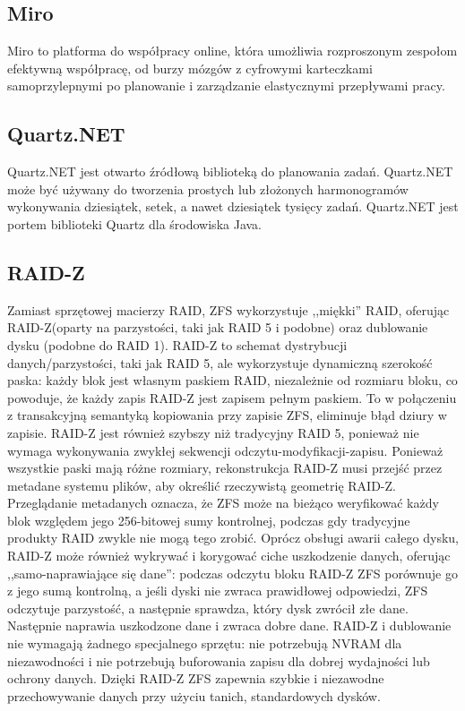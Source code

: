 \documentclass[12pt,a4paper]{article}
\begin{document}
		\subsection{Miro}
			\indent Miro to platforma do współpracy online, która umożliwia rozproszonym zespołom efektywną współpracę, od burzy mózgów z cyfrowymi karteczkami samoprzylepnymi
					po planowanie i zarządzanie elastycznymi przepływami pracy.
		
		\subsection{Quartz.NET}
			\indent Quartz.NET jest otwarto źródłową biblioteką do planowania zadań.
			Quartz.NET może być używany do tworzenia prostych lub złożonych harmonogramów wykonywania
			dziesiątek, setek, a nawet dziesiątek tysięcy zadań.
			Quartz.NET jest portem biblioteki Quartz dla środowiska Java. 	 
		
		\subsection{RAID-Z}
			\indent Zamiast sprzętowej macierzy RAID, ZFS wykorzystuje ,,miękki'' RAID, oferując RAID-Z(oparty na parzystości, taki jak RAID 5 i podobne) oraz dublowanie dysku
			(podobne do RAID 1). RAID-Z to schemat dystrybucji danych/parzystości, taki jak RAID 5, ale wykorzystuje dynamiczną szerokość paska: każdy blok jest własnym paskiem
			RAID, niezależnie od rozmiaru
			bloku, co powoduje, że każdy zapis RAID-Z jest zapisem pełnym paskiem. To w połączeniu z transakcyjną semantyką kopiowania przy zapisie ZFS, eliminuje błąd dziury w zapisie.
			RAID-Z jest również szybszy niż tradycyjny RAID 5, ponieważ nie wymaga wykonywania zwykłej sekwencji odczytu-modyfikacji-zapisu. Ponieważ wszystkie paski mają różne rozmiary,
			rekonstrukcja RAID-Z musi przejść przez metadane systemu plików, aby określić rzeczywistą geometrię RAID-Z. Przeglądanie metadanych oznacza, że ZFS może na bieżąco
			weryfikować każdy blok względem jego 256-bitowej sumy kontrolnej, podczas gdy tradycyjne produkty RAID zwykle nie mogą tego zrobić. Oprócz obsługi awarii całego dysku,
			RAID-Z może również wykrywać i korygować ciche uszkodzenie danych, oferując ,,samo-naprawiające się dane'': podczas odczytu bloku RAID-Z ZFS porównuje go z jego sumą kontrolną,
			a jeśli dyski nie zwraca prawidłowej odpowiedzi, ZFS odczytuje parzystość, a następnie sprawdza, który dysk zwrócił złe dane. Następnie naprawia uszkodzone dane i zwraca
			dobre dane. RAID-Z i dublowanie nie wymagają żadnego specjalnego sprzętu: nie potrzebują NVRAM dla niezawodności i nie potrzebują buforowania zapisu dla dobrej wydajności
			lub ochrony danych. Dzięki RAID-Z ZFS zapewnia szybkie i niezawodne przechowywanie danych przy użyciu tanich, standardowych dysków.
						 
\end{document}
